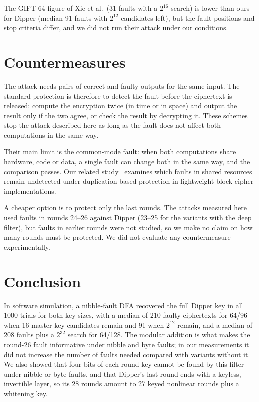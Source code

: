 \documentclass[11pt,a4paper]{article}
\begin{document}
The GIFT-64 figure of Xie et al.\ (31 faults with a $2^{16}$ search) is lower than ours for
Dipper (median 91 faults with $2^{12}$ candidates left), but the fault positions and stop
criteria differ, and we did not run their attack under our conditions.

\section{Countermeasures}

The attack needs pairs of correct and faulty outputs for the same input. The standard
protection is therefore to detect the fault before the ciphertext is released: compute the
encryption twice (in time or in space) and output the result only if the two agree, or check the
result by decrypting it. These schemes stop the attack described here as long as the fault does
not affect both computations in the same way.

Their main limit is the common-mode fault: when both computations share hardware, code or
data, a single fault can change both in the same way, and the comparison passes. Our related
study~\cite{Huseynli2027} examines which faults in shared resources remain undetected under
duplication-based protection in lightweight block cipher implementations.

A cheaper option is to protect only the last rounds. The attacks measured here used faults in
rounds 24--26 against Dipper (23--25 for the variants with the deep filter), but faults in
earlier rounds were not studied, so we make no claim on how many rounds must be protected. We
did not evaluate any countermeasure experimentally.

\section{Conclusion}

In software simulation, a nibble-fault DFA recovered the full Dipper key in all 1000 trials for
both key sizes, with a median of 210 faulty ciphertexts for 64/96 when 16 master-key candidates
remain and 91 when $2^{12}$ remain, and a median of 208 faults plus a $2^{32}$ search for 64/128.
The modular addition is what makes the round-26 fault informative under nibble and byte faults;
in our measurements it did not increase the number of faults needed compared with variants
without it. We also showed that four bits of each round key cannot be found by this filter under
nibble or byte faults, and that Dipper's last round ends with a keyless, invertible layer, so its
28 rounds amount to 27 keyed nonlinear rounds plus a whitening key.
\end{document}
